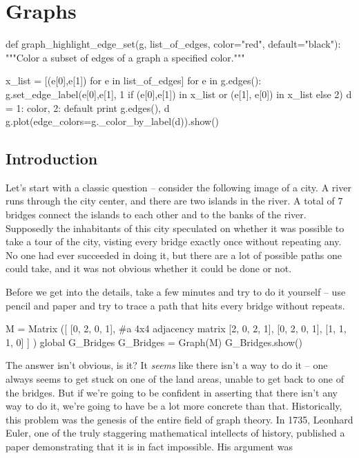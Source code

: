 \chapter{Graphs}


\begin{sageverbatim}

def graph_highlight_edge_set(g, list_of_edges, color="red", default="black"):
    """Color a subset of edges of a graph a specified color."""
    
    x_list = [(e[0],e[1]) for e in list_of_edges]
    for e in g.edges():
        g.set_edge_label(e[0],e[1], 1 if (e[0],e[1]) in x_list or  (e[1], e[0]) in x_list else 2)
    d = {1: color, 2: default}
    print g.edges(), d
    g.plot(edge_colors=g._color_by_label(d)).show()

\end{sageverbatim}



\section{Introduction}

Let's start with a classic question -- consider the following image of a city.
A river runs through the city center, and there are two islands in the river.
A total of 7 bridges connect the islands to each other and to the banks of the
river.  Supposedly the inhabitants of this city speculated on whether it was
possible to take a tour of the city, visting every bridge exactly once without
repeating any.  No one had ever succeeded in doing it, but there are a lot of possible paths one could take, and it was not obvious whether it could be done or not.  


Before we get into the details, take a few minutes and try to do it yourself --
use pencil and paper and try to trace a path that hits every bridge without
repeats.


\begin{sageverbatim}
M = Matrix ([ [0, 2, 0, 1],   #a 4x4 adjacency matrix
              [2, 0, 2, 1], 
              [0, 2, 0, 1],
              [1, 1, 1, 0] ] )
global G_Bridges
G_Bridges = Graph(M)
G_Bridges.show()
\end{sageverbatim}



The answer isn't obvious, is it?  It \emph{seems} like there isn't a way to do
it -- one always seems to get stuck on one of the land areas, unable to get
back to one of the bridges.  But if we're going to be confident in asserting
that there isn't any way to do it, we're going to have be a lot more concrete
than that.  Historically, this problem was the genesis of the entire field of
graph theory.  In 1735, Leonhard Euler, one of the truly staggering
mathematical intellects of history, published a paper demonstrating that it is in fact impossible.  His argument was  


